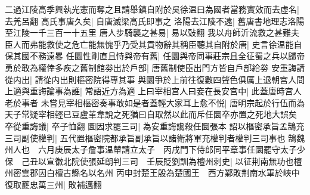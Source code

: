 二過江陵高季興執光憲而奪之且請舉鎮自附於吳徐温曰為國者當務實效而去虛名|{
	去羌呂翻}
高氏事唐久矣|{
	自唐滅梁高氏即事之}
洛陽去江陵不遠|{
	舊唐書地理志洛陽至江陵一千三百一十五里}
唐人步騎襲之甚易|{
	易以䜴翻}
我以舟師沂流救之甚難夫臣人而弗能救使之危亡能無愧乎乃受其貢物辭其稱臣聽其自附於唐|{
	史言徐温能自保其國不務遠畧}
任圜性剛直且恃與帝有舊|{
	任圜與帝同事莊宗且全征蜀之兵以歸帝}
勇於敢為權倖多疾之舊制館劵出於戶部|{
	唐舊制使臣出門方皆自戶部給劵}
安重誨請從内出|{
	請從内出則樞密院得專其事}
與圜爭於上前往復數四聲色俱厲上退朝宫人問上適與重誨論事為誰|{
	常語近方為適}
上曰宰相宫人曰妾在長安宫中|{
	此蓋唐時宫人老於事者}
未嘗見宰相樞密奏事敢如是者蓋輕大家耳上愈不悦|{
	唐明宗起於行伍而為天子常疑宰相輕已豆盧革韋說之死猶曰自取然以此而斥任圜卒亦置之死地大誤矣}
卒從重誨議|{
	卒子恤翻}
圜因求罷三司|{
	為安重誨讒殺任圜張本}
詔以樞密承旨孟鵠充三司副使權判|{
	五代置樞密院都承旨副承旨以諸衛將軍充權判者權判三司事也}
鵠魏州人也　六月庚辰太子詹事温輦請立太子　丙戌門下侍郎同平章事任圜罷守太子少保　己丑以宣徽北院使張延朗判三司　壬辰貶劉訓為檀州刺史|{
	以征荆南無功也檀州密雲郡因白檀古縣名以名州}
丙申封楚王殷為楚國王　西方鄴敗荆南水軍於峽中復取夔忠萬三州|{
	敗補邁翻}


